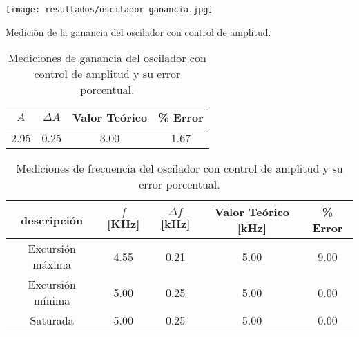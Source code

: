 \begin{ilustracion}[ht]
    \centering
    \texttt{[image: resultados/oscilador-ganancia.jpg]}
    \caption{Medición de la ganancia del oscilador con control de amplitud.}
    \label{fig:oscilador-con-control-ganancia}
\end{ilustracion}

\begin{table}[ht]
\centering
\begin{tabular}{|c|c|c|c|}
\hline
\(A\) & \(\Delta A\) & Valor Teórico & \% Error \\ \hline
2.95 & 0.25 & 3.00 & 1.67 \\ \hline
\end{tabular}
\caption{Mediciones de ganancia del oscilador con control de amplitud y su error porcentual.}
\label{tab:mediciones-ganancia-error}
\end{table}

\begin{table}[ht]
\centering
\begin{tabular}{|c|c|c|c|c|}
\hline
descripción & \(f\) [KHz] & \(\Delta f\) [kHz] & Valor Teórico [kHz] & \% Error \\ \hline
Excursión máxima & 4.55 & 0.21 & 5.00 & 9.00 \\ \hline
Excursión mínima & 5.00 & 0.25 & 5.00 & 0.00 \\ \hline
Saturada & 5.00 & 0.25 & 5.00 & 0.00 \\ \hline
\end{tabular}
\caption{Mediciones de frecuencia del oscilador con control de amplitud y su error porcentual.}
\label{tab:mediciones-frecuencia-error}
\end{table}